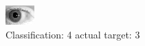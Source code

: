 \begin{figure}[h!]
\begin{center}
\includegraphics[width=0.60\columnwidth]{figures/ID283_class_4_target_3.png}
\end{center}
\caption{ Classification: 4 actual target: 3}
\label{fig:ID283_class_4_target_3}
\end{figure}
